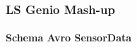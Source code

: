 \documentclass{beamer}
\begin{document}
\begin{frame}
\frametitle{LS Genio Mash-up}
\framesubtitle{Schema Avro SensorData}
\begin{figure}%
	\centering
	\qquad
\end{figure}
\end{frame}
\end{document}
